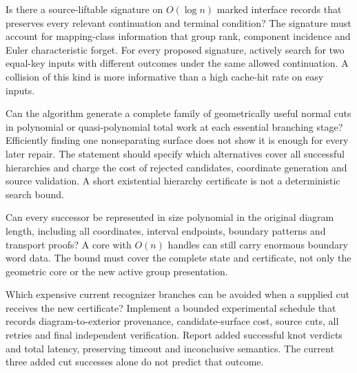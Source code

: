 \begin{question}
Is there a source-liftable signature on $O(\log n)$ marked interface records
that preserves every relevant continuation and terminal condition? The
signature must account for mapping-class information that group rank,
component incidence and Euler characteristic forget. For every proposed
signature, actively search for two equal-key inputs with different outcomes
under the same allowed continuation. A collision of this kind is more
informative than a high cache-hit rate on easy inputs.
\end{question}

\begin{question}
Can the algorithm generate a complete family of geometrically useful normal
cuts in polynomial or quasi-polynomial total work at each essential branching
stage? Efficiently finding one nonseparating surface does not show it is enough
for every later repair. The statement should specify which alternatives cover
all successful hierarchies and charge the cost of rejected candidates,
coordinate generation and source validation. A short existential hierarchy
certificate is not a deterministic search bound.
\end{question}

\begin{question}
Can every successor be represented in size polynomial in the original diagram
length, including all coordinates, interval endpoints, boundary patterns and
transport proofs? A core with $O(n)$ handles can still carry enormous boundary
word data. The bound must cover the complete state and certificate, not only
the geometric core or the new active group presentation.
\end{question}

\begin{question}
Which expensive current recognizer branches can be avoided when a supplied cut
receives the new certificate? Implement a bounded experimental schedule that
records diagram-to-exterior provenance, candidate-surface cost, source cuts,
all retries and final independent verification. Report added successful knot
verdicts and total latency, preserving timeout and inconclusive semantics. The
current three added cut successes alone do not predict that outcome.
\end{question}


